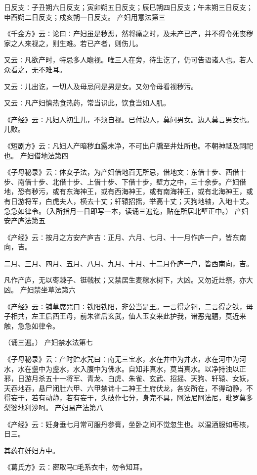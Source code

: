 \documentclass[a4paper,12pt,UTF8,twoside]{ctexbook}
\begin{document}
日反支∶子丑朔六日反支；寅卯朔五日反支；辰巳朔四日反支；午未朔三日反支；申酉朔二日反支；戍亥朔一日反支。
产妇用意法第三

《千金方》云∶论曰∶产妇虽是秽恶，然将痛之时，及未产已产，并不得令死丧秽家之人来视之，则生难。若已产者，则伤儿。

又云∶凡欲产时，特忌多人瞻视。唯三人在旁，待生讫了，仍可告语诸人也。若人众看之，无不难耳。

又云∶儿出讫，一切人及母忌问是男是女。又勿令母看视秽污。

又云∶凡产妇慎热食热药，常当识此，饮食当如人肌。

《产经》云∶凡妇人初生儿，不须自视。已付边人，莫问男女。边人莫言男女也。儿败。

《短剧方》云∶凡妇人产暗秽血露未净，不可出户牖至井灶所也。不朝神祗及祠祀也。
产妇借地法第四

《子母秘录》云∶体女子法，为产妇借地百无所忌，借地文∶东借十步、西借十步、南借十步、北借十步、上借十步、下借十步，壁方之中，三十余步。产妇借地，恐有秽污，或有东海神王，或有西海神王，或有南海神王，或有北海神王，或有日游将军，白虎夫人，横去十丈；轩辕招摇，举高十丈；天狗地轴，入地十丈。急急如律令。（入所指月一日即写一本，读诵三遍讫，贴在所居北壁正中。）
产妇安产庐法第五

《产经》云∶按月之方安产庐吉∶正月、六月、七月、十一月作庐一户，皆东南向，吉。

二月、三月、四月、五月、八月、九月、十月、十二月作庐一户，皆西南向，吉。

凡作产庐，无以枣棘子、铤戟杖；又禁居生麦稼水树下，大凶。又勿近灶祭，亦大凶。
产妇禁坐草法第六

《产经》云∶铺草席咒曰∶铁阳铁阳，非公当是王。一言得之铜，二言得之铁，母子相共，左王后西王母，前朱雀后玄武，仙人玉女来此护我，诸恶鬼魉，莫近来触，急急如律令。

（诵三遍。）
产妇禁水法第七

《子母秘录》云∶产时贮水咒曰∶南无三宝水，水在井中为井水，水在河中为河水，水在盏中为盏水，水入腹中为佛水。自知非真水，莫当真水。以净持浊以正邪，日游月杀五十一将军、青龙、白虎、朱雀、玄武、招摇、天狗、轩辕、女妖，天吞地吞，悬尸闭肚六甲、六甲禁讳十二神王土府伏龙，各安所在，不得动静，不得妄干，若有动静，若有妄干，头破作七分，身完不具，阿法尼阿法尼，毗罗莫多梨婆地利沙呵。
产妇易产法第八

《产经》云∶妊身垂七月常可服丹参膏，坐卧之间不觉忽生也。以温酒服如枣核，日三。

其药在妊妇方中。

《葛氏方》云∶密取马□毛系衣中，勿令知耳。
\end{document}
